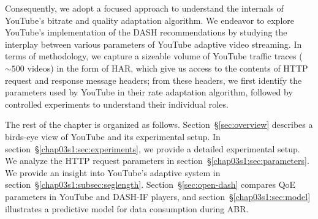 Consequently, we adopt a focused approach to understand the internals of YouTube's bitrate and quality adaptation algorithm.
We endeavor to explore YouTube's implementation of the DASH recommendations by studying the interplay between various parameters of YouTube adaptive video streaming.
In terms of methodology, we capture a sizeable volume of YouTube traffic traces ($\sim500$ videos) in the form of \ac{HAR}, which give us access to the contents of HTTP request and response message headers;
from these headers, we first identify the parameters used by YouTube in their rate adaptation algorithm, followed by controlled experiments to understand their individual roles.
\begin{comment}
In summary, our contributions in this study are as follows.
\begin{enumerate}
	\item We illustrate a methodology to study YouTube's adaptive streaming behavior in-depth (\S\ref{chap03s1:sec:experiments}) -- we identify and closely study the interplay among important parameters enabling this streaming algorithm (\S\ref{chap03s1:sec:parameters}).
	\item Our experiments reveal that YouTube adapts the {\it segment length} parameter before attempting to adapt video resolution -- a phenomenon not reported in the literature (\S\ref{chap03s1:subsec:seglength}).
	\item We observe that segment length adaptation leads to much lower values of data wastage on average, than reported by prior studies.
	\item We propose an analytical model, augmented with a machine learning based classifier, which enables prediction of data consumption for an initial playback video quality when it is possible to estimate the network conditions a priori using existing mechanism like~\cite{Zou2015}  (\S\ref{chap03s1:sec:model}).
\end{enumerate}
\end{comment}

The rest of the chapter is organized as follows. Section~\S\ref{sec:overview} describes a birds-eye view of YouTube and its experimental setup. In section~\S\ref{chap03s1:sec:experiments}, we provide a detailed experimental setup. We analyze the HTTP request parameters in section~\S\ref{chap03s1:sec:parameters}. We provide an insight into YouTube's adaptive system in section~\S\ref{chap03s1:subsec:seglength}. Section~\S\ref{sec:open-dash} compares QoE parameters in YouTube and DASH-IF players, and section~\S\ref{chap03s1:sec:model} illustrates a predictive model for data consumption during ABR.

